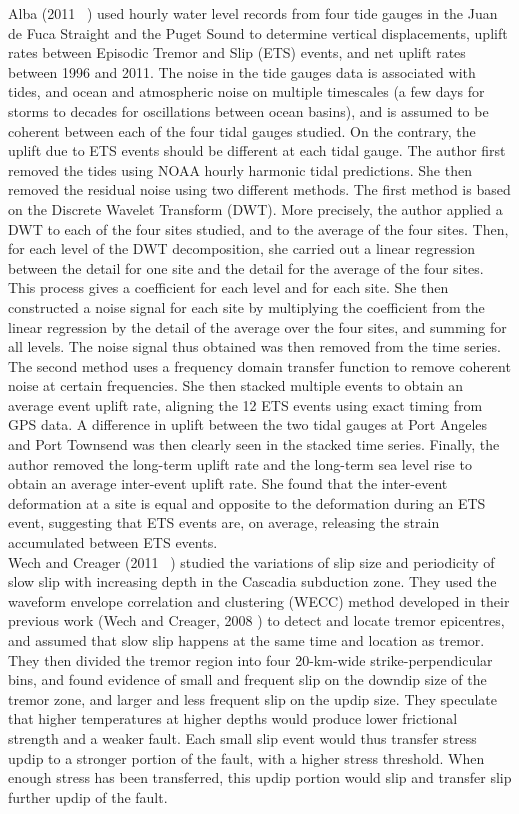 \documentclass[main.tex]{subfiles}
\begin{document}
Alba (2011 ~\cite{ALB_2011}) used hourly water level records from four tide gauges in the Juan de Fuca Straight and the Puget Sound to determine vertical displacements, uplift rates between Episodic Tremor and Slip (ETS) events, and net uplift rates between 1996 and 2011. The noise in the tide gauges data is associated with tides, and ocean and atmospheric noise on multiple timescales (a few days for storms to decades for oscillations between ocean basins), and is assumed to be coherent between each of the four tidal gauges studied. On the contrary, the uplift due to ETS events should be different at each tidal gauge. The author first removed the tides using NOAA hourly harmonic tidal predictions. She then removed the residual noise using two different methods. The first method is based on the Discrete Wavelet Transform (DWT). More precisely, the author applied a DWT to each of the four sites studied, and to the average of the four sites. Then, for each level of the DWT decomposition, she carried out a linear regression between the detail for one site and the detail for the average of the four sites. This process gives a coefficient for each level and for each site. She then constructed a noise signal for each site by multiplying the coefficient from the linear regression by the detail of the average over the four sites, and summing for all levels. The noise signal thus obtained was then removed from the time series. The second method uses a frequency domain transfer function to remove coherent noise at certain frequencies. She then stacked multiple events to obtain an average event uplift rate, aligning the 12 ETS events using exact timing from GPS data. A difference in uplift between the two tidal gauges at Port Angeles and Port Townsend was then clearly seen in the stacked time series. Finally, the author removed the long-term uplift rate and the long-term sea level rise to obtain an average inter-event uplift rate. She found that the inter-event deformation at a site is equal and opposite to the deformation during an ETS event, suggesting that ETS events are, on average, releasing the strain accumulated between ETS events. \\

Wech and Creager (2011~ \cite{WEC_2011}) studied the variations of slip size and periodicity of slow slip with increasing depth in the Cascadia subduction zone. They used the waveform envelope correlation and clustering (WECC) method developed in their previous work (Wech and Creager, 2008 \cite{WEC_2008}) to detect and locate tremor epicentres, and assumed that slow slip happens at the same time and location as tremor. They then divided the tremor region into four 20-km-wide strike-perpendicular bins, and found evidence of small and frequent slip on the downdip size of the tremor zone, and larger and less frequent slip on the updip size. They speculate that higher temperatures at higher depths would produce lower frictional strength and a weaker fault. Each small slip event would thus transfer stress updip to a stronger portion of the fault, with a higher stress threshold. When enough stress has been transferred, this updip portion would slip and transfer slip further updip of the fault. \\
\end{document}
